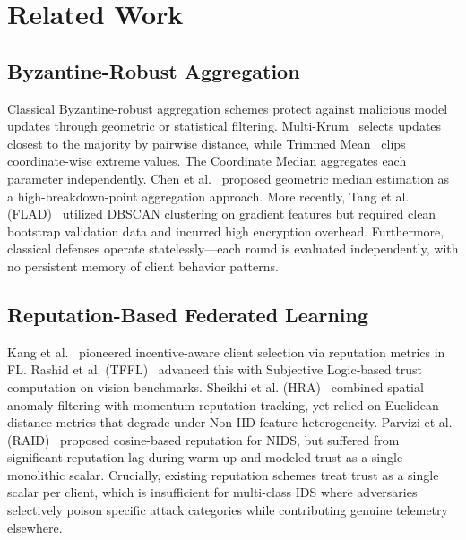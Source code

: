 \documentclass[conference]{IEEEtran}
\begin{document}
\section{Related Work}
\label{sec:related}

\subsection{Byzantine-Robust Aggregation}
Classical Byzantine-robust aggregation schemes protect against malicious model updates through geometric or statistical filtering. Multi-Krum~\cite{blanchard2017krum} selects updates closest to the majority by pairwise distance, while Trimmed Mean~\cite{yin2018trimmedmean} clips coordinate-wise extreme values. The Coordinate Median aggregates each parameter independently. Chen et al.~\cite{chen2017distributed} proposed geometric median estimation as a high-breakdown-point aggregation approach. More recently, Tang et al. (FLAD)~\cite{tang2025flad} utilized DBSCAN clustering on gradient features but required clean bootstrap validation data and incurred high encryption overhead. Furthermore, classical defenses operate statelessly---each round is evaluated independently, with no persistent memory of client behavior patterns.

\subsection{Reputation-Based Federated Learning}
Kang et al.~\cite{kang2020reputation} pioneered incentive-aware client selection via reputation metrics in FL. Rashid et al. (TFFL)~\cite{rashid2025tffl} advanced this with Subjective Logic-based trust computation on vision benchmarks. Sheikhi et al. (HRA)~\cite{sheikhi2025hra} combined spatial anomaly filtering with momentum reputation tracking, yet relied on Euclidean distance metrics that degrade under Non-IID feature heterogeneity. Parvizi et al. (RAID)~\cite{parvizi2026raid} proposed cosine-based reputation for NIDS, but suffered from significant reputation lag during warm-up and modeled trust as a single monolithic scalar. Crucially, existing reputation schemes treat trust as a single scalar per client, which is insufficient for multi-class IDS where adversaries selectively poison specific attack categories while contributing genuine telemetry elsewhere.
\end{document}
